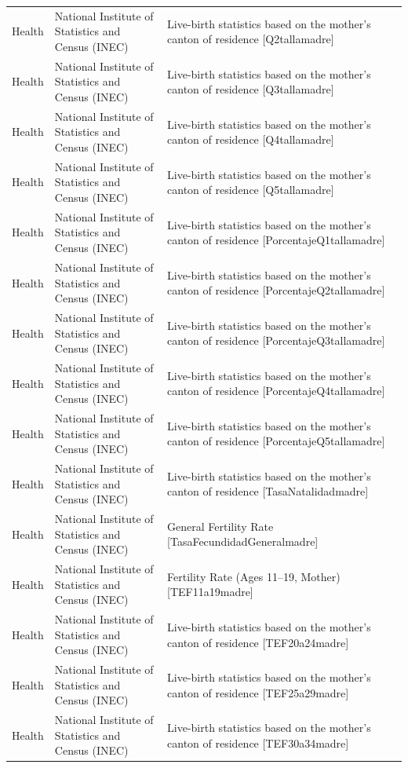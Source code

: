 \begin{landscape}
\begin{longtable}[t]{>{\raggedright\arraybackslash}p{3.4cm}>{\raggedright\arraybackslash}p{5.6cm}>{\raggedright\arraybackslash}p{12.4cm}}
Health & National Institute of Statistics and Census (INEC) & Live-birth statistics based on the mother's canton of residence [Q2tallamadre]\\
Health & National Institute of Statistics and Census (INEC) & Live-birth statistics based on the mother's canton of residence [Q3tallamadre]\\
Health & National Institute of Statistics and Census (INEC) & Live-birth statistics based on the mother's canton of residence [Q4tallamadre]\\
Health & National Institute of Statistics and Census (INEC) & Live-birth statistics based on the mother's canton of residence [Q5tallamadre]\\
Health & National Institute of Statistics and Census (INEC) & Live-birth statistics based on the mother's canton of residence [PorcentajeQ1tallamadre]\\
Health & National Institute of Statistics and Census (INEC) & Live-birth statistics based on the mother's canton of residence [PorcentajeQ2tallamadre]\\
Health & National Institute of Statistics and Census (INEC) & Live-birth statistics based on the mother's canton of residence [PorcentajeQ3tallamadre]\\
Health & National Institute of Statistics and Census (INEC) & Live-birth statistics based on the mother's canton of residence [PorcentajeQ4tallamadre]\\
Health & National Institute of Statistics and Census (INEC) & Live-birth statistics based on the mother's canton of residence [PorcentajeQ5tallamadre]\\
Health & National Institute of Statistics and Census (INEC) & Live-birth statistics based on the mother's canton of residence [TasaNatalidadmadre]\\
Health & National Institute of Statistics and Census (INEC) & General Fertility Rate [TasaFecundidadGeneralm\allowbreak{}adre]\\
Health & National Institute of Statistics and Census (INEC) & Fertility Rate (Ages 11–19, Mother) [TEF11a19madre]\\
Health & National Institute of Statistics and Census (INEC) & Live-birth statistics based on the mother's canton of residence [TEF20a24madre]\\
Health & National Institute of Statistics and Census (INEC) & Live-birth statistics based on the mother's canton of residence [TEF25a29madre]\\
Health & National Institute of Statistics and Census (INEC) & Live-birth statistics based on the mother's canton of residence [TEF30a34madre]\\

\end{longtable}
\end{landscape}
